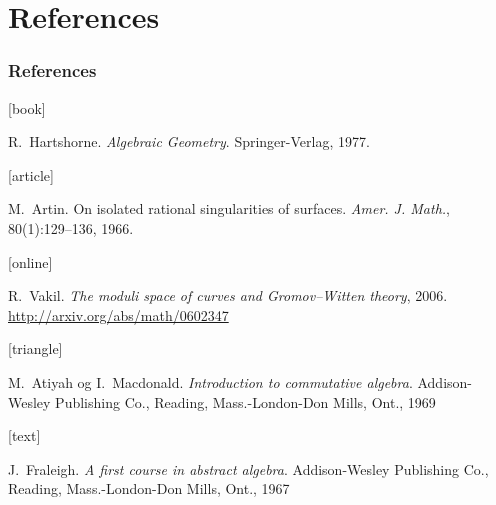 \documentclass[UKenglish]{beamer}
\begin{document}
\section{References}


\begin{frame}[allowframebreaks]
    \frametitle{References}

    \begin{thebibliography}{}

        [book]

        R.~Hartshorne.
        \newblock \emph{Algebraic Geometry}.
        \newblock Springer-Verlag, 1977.

        [article]

        M.~Artin.
        \newblock On isolated rational singularities of surfaces.
        \newblock \emph{Amer. J. Math.}, 80(1):129--136, 1966.

        [online]

        R.~Vakil.
        \newblock \emph{The moduli space of curves and Gromov--Witten theory}, 2006.
        \newblock \url{http://arxiv.org/abs/math/0602347}

        [triangle]

        M.~Atiyah og I.~Macdonald.
        \newblock \emph{Introduction to commutative algebra}.
        \newblock Addison-Wesley Publishing Co., Reading, Mass.-London-Don
        Mills, Ont., 1969

        [text]

        J.~Fraleigh.
        \newblock \emph{A first course in abstract algebra}.
        \newblock Addison-Wesley Publishing Co., Reading, Mass.-London-Don Mills, Ont., 1967

    \end{thebibliography}
\end{frame}
\end{document}
